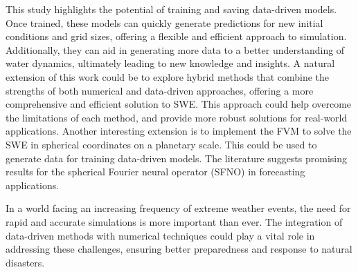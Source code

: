 This study highlights the potential of training and saving data-driven models.
Once trained, these models can quickly generate predictions for new initial conditions and grid sizes, offering a flexible and efficient approach to simulation.
Additionally, they can aid in generating more data to a better understanding of water dynamics, ultimately leading to new knowledge and insights.
A natural extension of this work could be to explore hybrid methods that combine the strengths of both numerical and data-driven approaches, offering a more comprehensive and efficient solution to SWE.
This approach could help overcome the limitations of each method, and provide more robust solutions for real-world applications.
Another interesting extension is to implement the FVM to solve the SWE in spherical coordinates on a planetary scale.
This could be used to generate data for training data-driven models.
The literature suggests promising results for the spherical Fourier neural operator (SFNO) in forecasting applications.

In a world facing an increasing frequency of extreme weather events, the need for rapid and accurate simulations is more important than ever.
The integration of data-driven methods with numerical techniques could play a vital role in addressing these challenges, ensuring better preparedness and response to natural disasters. 
